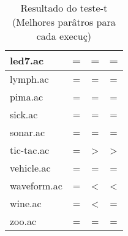 \begin{table}[htbp]
\begin{tabular}{|l|c|c|c|}
		\hline
		led7.ac                 & =                     & =                     & =                     \\
		\hline
		lymph.ac                & =                     & =                     & =                     \\
		\hline
		pima.ac                 & =                     & =                     & =                     \\
		\hline
		sick.ac                 & =                     & =                     & =                     \\
		\hline
		sonar.ac                & =                     & =                     & =                     \\
		\hline
		tic-tac.ac              & =                     & >                     & >                     \\
		\hline
		vehicle.ac              & =                     & =                     & =                     \\
		\hline
		waveform.ac             & =                     & <                     & <                     \\
		\hline
		wine.ac                 & =                     & <                     & =                     \\
		\hline
		zoo.ac                  & =                     & =                     & =                     \\
		\hline
		\end{tabular}
	\caption{Resultado do teste-t (Melhores parâtros para cada execuç)}
	\label{tab:ttest_best}
\end{table}